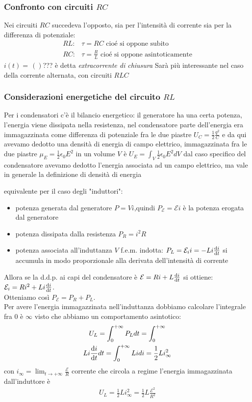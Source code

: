 \subsubsection{Confronto con circuiti $RC$}
Nei circuiti $RC$ succedeva l'opposto, sia per l'intensità di corrente sia per la differenza di potenziale:
\begin{align*}
	RL: & \tau=RC \text{ cioé si oppone subito}\\
	RC: & \tau=\frac{R}{L}	 \text{ cioé si oppone asintoticamente}
\end{align*}
$i(t)=\frac{}{}()$???
è detta \textit{extracorrente di chiusura}
Sarà più interessante nel caso della corrente alternata, con circuiti $RLC$


\subsubsection{Considerazioni energetiche del circuito $RL$}
Per i condensatori c'è il bilancio energetico: il generatore ha una certa potenza, l'energia viene dissipata nella resistenza, nel condensatore parte dell'energia era immagazzinata come differenza di potenziale fra le due piastre $U_C=\frac{1}{2}\frac{q^2}{C}$ e da qui avevamo dedotto una densità di energia di campo elettrico, immagazzinata fra le due piastre $\mu_E=\frac{1}{2}\epsilon_0 E^2$
in un volume $V$ è $U_E=\int_V \frac{1}{2}\epsilon_0 E^2  dV$
dal caso specifico del condensatore avevamo dedotto l'energia associata ad un campo elettrico, ma vale in generale la definizione di densità di energia

equivalente per il caso degli "induttori":
\begin{itemize}
	\item potenza generata dal generatore $P=Vi$,quindi $P_\mathcal{E}=\mathcal{E}i$ è la potenza erogata dal generatore
	\item potenza dissipata dalla resistenza $P_R=i^2R$
	\item potenza associata all'induttanza $V$ f.e.m. indotta: $P_L=\mathcal{E}_i i=-Li\dv{i}{t}$ si accumula in modo proporzionale alla derivata dell'intensità di corrente
\end{itemize}
Allora se la d.d.p. ai capi del condensatore è $\mathcal{E}=Ri +L\dv{i}{t}$ si ottiene: $\mathcal{E}_i=Ri^2+Li\dv{i}{t}$.\\
Otteniamo così $P_\mathcal{E}=P_R+P_L$.\\
Per avere l'energia immagazzinata nell'induttanza dobbiamo calcolare l'integrale fra $0$ è $\infty$ visto che abbiamo un comportamento asintotico:
\begin{gather*}
	U_L=\int^{+\infty}_0P_Ldt=\int^{+\infty}_0\\ Li\dv{i}{t}dt=\int^{+\infty}_0Lidi=\frac{1}{2}Li_\infty^2
\end{gather*}
con $i_\infty=\lim_{t\to +\infty} \frac{\mathcal{E}}{R}$ corrente che circola a regime
l'energia immagazzinata dall'induttore è
\begin{gather*}
	U_L=\frac{1}{2}Li_{\infty}^2=\frac{1}{2}L\frac{\mathcal{E}^2}{R^2}
\end{gather*}

